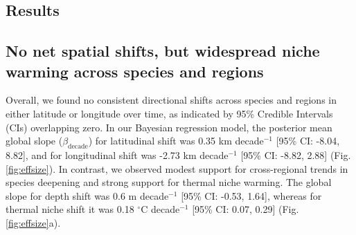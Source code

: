 \documentclass[11pt]{article}
\begin{document}
\begin{spacing}{1.5}





\newpage

\section{Results}

\subsection{No net spatial shifts, but widespread niche warming across species and regions}

Overall, we found no consistent directional shifts across species and regions in either latitude or longitude over time, as indicated by 95\% Credible Intervals (CIs) overlapping zero. In our Bayesian regression model, the posterior mean global slope ($\beta_{\text{decade}}$) for latitudinal shift was 0.35 km decade$^{-1}$ [95\% CI: -8.04, 8.82], and for longitudinal shift was -2.73 km decade$^{-1}$ [95\% CI: -8.82, 2.88] (Fig. \ref{fig:effsize}). In contrast, we observed modest support for cross-regional trends in species deepening and strong support for thermal niche warming. The global slope for depth shift was 0.6 m decade$^{-1}$ [95\% CI: -0.53, 1.64], whereas for thermal niche shift it was 0.18 $^{\circ}$C decade$^{-1}$ [95\% CI: 0.07, 0.29] (Fig. \ref{fig:effsize}a).



\end{spacing}
\end{document}
